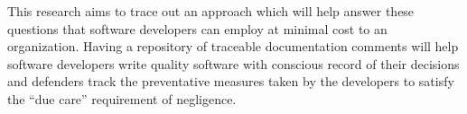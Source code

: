 This research aims to trace out an approach which will help answer these
questions that software developers can employ at minimal cost to an 
organization. Having a repository of traceable documentation comments will help
software developers write quality software with conscious record of their
decisions and defenders track the preventative measures taken by
the developers to satisfy the ``due care'' requirement of negligence.

